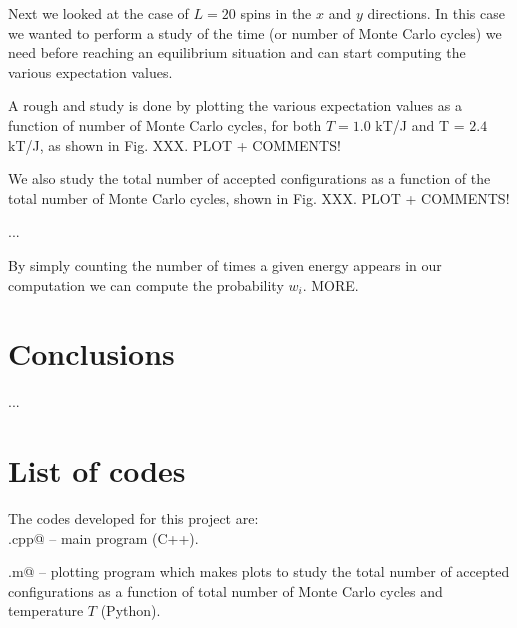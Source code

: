 \documentclass{article}
\begin{document}
\begin{multicols}{2}
Next we looked at the case of $L = 20$ spins in the $x$ and $y$ directions. In this case we wanted to perform a study of the time (or number of Monte Carlo cycles) we need before reaching an equilibrium situation and can start computing the various expectation values. 

A rough and study is done by plotting the various expectation values as a function of number of Monte Carlo cycles, for both $T = 1.0$ kT/J and T = $2.4$ kT/J, as shown in Fig. XXX. PLOT + COMMENTS!

We also study the total number of accepted configurations as a function of the total number of Monte Carlo cycles, shown in Fig. XXX. PLOT + COMMENTS! 

...

By simply counting the number of times a given energy appears in our computation we can compute the probability $w_i$. MORE. 




\section{Conclusions}

...





\section{List of codes}

The codes developed for this project are:\\

\noindent \verb@main.cpp@ -- main program (C++).

\noindent \verb@plotting.m@ -- plotting program which makes plots to study the total number of accepted configurations as a function of total number of Monte Carlo cycles and temperature $T$ (Python).

\end{multicols}
\end{document}
